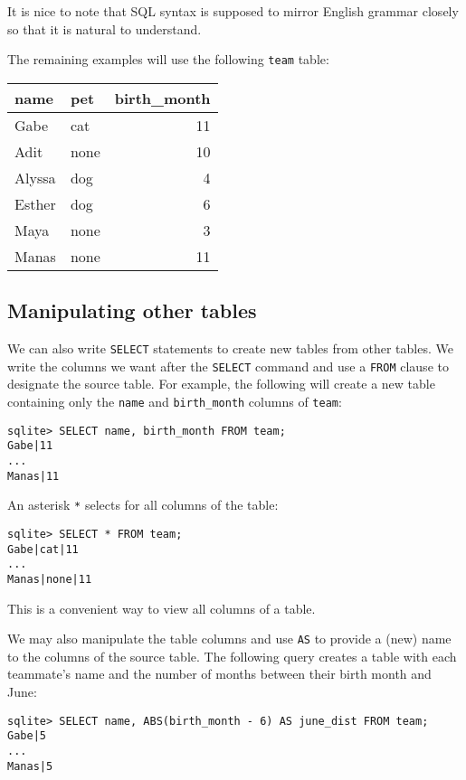 \begin{meta}
It is nice to note that SQL syntax is supposed to mirror English grammar closely so that it is natural to understand. 
\end{meta}

The remaining examples will use the following \lstinline{team} table: 
\begin{table}[h]
    \centering
    \begin{tabular}{|l|l|r|}
    \hline
    \textbf{name}  & \textbf{pet} & \textbf{birth\_month} \\ \hline
    Gabe   & cat  & 11                              \\ \hline
    Adit   & none  & 10                              \\ \hline
    Alyssa & dog   & 4                               \\ \hline
    Esther & dog   & 6                               \\ \hline
    Maya   & none   & 3                               \\ \hline
    Manas  & none   & 11                              \\ \hline
    \end{tabular}
    \end{table}
\subsection{Manipulating other tables}
We can also write \lstinline{SELECT} statements to create new tables from other tables. We write the columns we want after the \lstinline{SELECT} command and use a \lstinline{FROM} clause to designate the source table. For example, the following will create a new table containing only the \lstinline{name} and \lstinline{birth_month} columns of \lstinline{team}: 
\begin{lstlisting}
sqlite> SELECT name, birth_month FROM team; 
Gabe|11
...
Manas|11
\end{lstlisting}

An asterisk \lstinline{*} selects for all columns of the table: 
\begin{lstlisting}
sqlite> SELECT * FROM team; 
Gabe|cat|11
...
Manas|none|11
\end{lstlisting}

This is a convenient way to view all columns of a table. 

We may also manipulate the table columns and use \lstinline{AS} to provide a (new) name to the columns of the source table. The following query creates a table with each teammate's name and the number of months between their birth month and June: 
\begin{lstlisting}
sqlite> SELECT name, ABS(birth_month - 6) AS june_dist FROM team; 
Gabe|5
...
Manas|5
\end{lstlisting}

